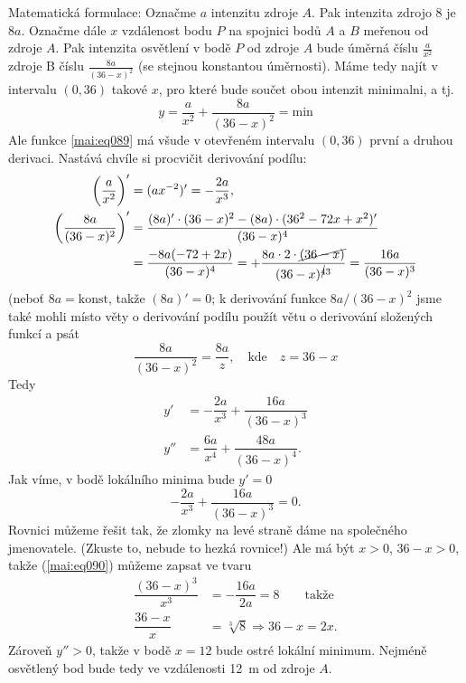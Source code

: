 \begin{mdframed}[style=mdexam]
\begin{example}
    Matematická formulace: Označme \(a\) intenzitu zdroje \(A\). Pak intenzita zdrojo \(8\) je
    \(8a\). Označme dále \(x\) vzdálenost bodu \(P\) na spojnici bodů \(A\) a \(B\) meřenou od
    zdroje \(A\). Pak intenzita osvětlení v bodě \(P\) od zdroje \(A\) bude úměrná číslu
    \(\frac{a}{x^2}\) zdroje B číslu \(\frac{8a}{(36 - x)^2}\) (se stejnou konstantou úměrnosti).
    Máme tedy najít v intervalu \((0,36)\) takové \(x\), pro které bude součet obou intenzit
    minimalni, a tj.
    \begin{equation}\label{mai:eq089}
      y = \dfrac{a}{x^2} + \dfrac{8a}{(36 - x)^2} = \text{min}
    \end{equation}
    Ale funkce \ref{mai:eq089} má všude v otevřeném intervalu  \((0,36)\) první a druhou derivaci.
    Nastává chvíle si procvičit derivování podílu:
    \begin{gather*}
      \begin{align*} 
        \left(\dfrac{a}{x^2}\right)'          
          &= (ax^{-2})' = -\dfrac{2a}{x^3},   \\ 
        \left( \dfrac{8a}{(36 - x)^2}\right)' 
          &= \dfrac{(8a)'\cdot(36 - x)^2 - (8a)\cdot(36^2 - 72x + x^2)'}{(36 - x)^4} \\
          &= \dfrac{-8a(-72 + 2x)}{(36 - x)^4} 
          = +\dfrac{8a\cdot2\cdot\cancel{(36 - x)}}{(36 - x)^{\cancel{4}3}}
          =  \dfrac{16a}{(36 - x)^3}
      \end{align*}
    \end{gather*}
    (neboť \(8a = \text{konst}\), takže \((8a)' = 0\); k derivování funkce \(8a/(36 - x)^2\) jsme
    také mohli místo věty o derivování podílu použít větu o derivování složených funkcí a psát
    \begin{equation*}
      \dfrac{8a}{(36 - x)^2} = \dfrac{8a}{z}, \quad\text{kde}\quad z = 36 - x
    \end{equation*}  
    Tedy 
    \begin{align*}
      y'  &= -\dfrac{2a}{x^3} + \dfrac{16a}{(36 - x)^3} \\
      y'' &=  \dfrac{6a}{x^4} + \dfrac{48a}{(36 - x)^4}. 
    \end{align*}
    Jak víme, v bodě lokálního minima bude \(y' = 0\)
    \begin{equation}\label{mai:eq090}
      -\dfrac{2a}{x^3} + \dfrac{16a}{(36 - x)^3} = 0.
    \end{equation}
    Rovnici můžeme řešit tak, že zlomky na levé straně dáme na společného jmenovatele. (Zkuste to,
    nebude to hezká rovnice!) Ale má být \(x > 0\), \(36 - x > 0\), takže (\ref{mai:eq090}) můžeme
    zapsat ve tvaru
    \begin{align*}
      \dfrac{(36 - x)^3}{x^3} &= -\dfrac{16a}{2a} = 8 \qquad\text{takže}      \\
      \dfrac{36 - x}{x}       &= \sqrt[3]{8} \Rightarrow 36 - x = 2x.
    \end{align*}
    Zároveň \(y''>0\), takže v bodě \(x=12\) bude ostré lokální minimum. Nejméně osvětlený bod bude
    tedy ve vzdálenosti \SI{12}{\m} od zdroje \(A\).


\end{example}
\end{mdframed}
